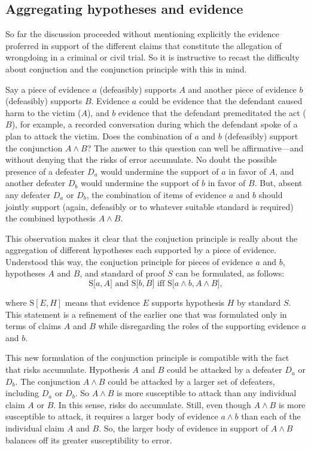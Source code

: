 \documentclass[10pt,dvipsnames,enabledeprecatedfontcommands]{scrartcl}
\newcommand{\et}{\wedge}
\begin{document}
\hypertarget{aggregating-hypotheses-and-evidence}{%
\subsection{Aggregating hypotheses and
evidence}\label{aggregating-hypotheses-and-evidence}}

So far the discussion proceeded without mentioning explicitly the
evidence proferred in support of the different claims that constitute
the allegation of wrongdoing in a criminal or civil trial. So it is
instructive to recast the difficulty about conjuction and the
conjunction principle with this in mind.

Say a piece of evidence \(a\) (defeasibly) supports \(A\) and another
piece of evidence \(b\) (defeasibly) supports \(B\). Evidence \(a\)
could be evidence that the defendant caused harm to the victim (\(A\)),
and \(b\) evidence that the defendant premeditated the act (\(B\)), for
example, a recorded conversation during which the defendant spoke of a
plan to attack the victim. Does the combination of \(a\) and \(b\)
(defeasibly) support the conjunction \(A \et B\)? The answer to this
question can well be affirmative---and without denying that the risks of
error accumulate. No doubt the possible presence of a defeater \(D_a\)
would undermine the support of \(a\) in favor of \(A\), and another
defeater \(D_b\) would undermine the support of \(b\) in favor of \(B\).
But, absent any defeater \(D_a\) or \(D_b\), the combination of items of
evidence \(a\) and \(b\) should jointly support (again, defeasibly or to
whatever suitable standard is required) the combined hypothesis
\(A \wedge B\).

This observation makes it clear that the conjuction principle is really
about the aggregation of different hypotheses each supported by a piece
of evidence. Understood this way, the conjuction principle for pieces of
evidence \(a\) and \(b\), hypotheses \(A\) and \(B\), and standard of
proof \(S\) can be formulated, as follows:
\[\text{S[$a, A$] and S[$b, B$] iff S[$a \wedge b, A\wedge B$]},\]

\noindent where \(\text{S}[E, H]\) means that evidence \(E\) supports
hypothesis \(H\) by standard \(S\). This statement is a refinement of
the earlier one that was formulated only in terms of claims \(A\) and
\(B\) while disregarding the roles of the supporting evidence \(a\) and
\(b\).

This new formulation of the conjunction principle is compatible with the
fact that risks accumulate. Hypothesis \(A\) and \(B\) could be attacked
by a defeater \(D_a\) or \(D_b\). The conjunction \(A \wedge B\) could
be attacked by a larger set of defeaters, including \(D_a\) or \(D_b\).
So \(A \wedge B\) is more susceptible to attack than any individual
claim \(A\) or \(B\). In this sense, risks do accumulate. Still, even
though \(A \wedge B\) is more susceptible to attack, it requires a
larger body of evidence \(a \wedge b\) than each of the individual claim
\(A\) and \(B\). So, the larger body of evidence in support of
\(A \wedge B\) balances off its greater susceptibility to error.
\end{document}
